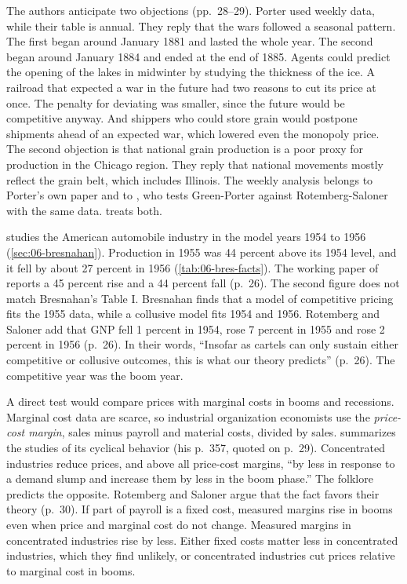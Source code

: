 The authors anticipate two objections (pp.~28--29). Porter used weekly data, while their table is annual. They reply
that the wars followed a seasonal pattern. The first began around January 1881 and lasted the whole year. The second
began around January 1884 and ended at the end of 1885. Agents could predict the opening of the lakes in midwinter by
studying the thickness of the ice. A railroad that expected a war in the future had two reasons to cut its price at
once. The penalty for deviating was smaller, since the future would be competitive anyway. And shippers who could store
grain would postpone shipments ahead of an expected war, which lowered even the monopoly price. The second objection is
that national grain production is a poor proxy for production in the Chicago region. They reply that national
movements mostly reflect the grain belt, which includes Illinois. The weekly analysis belongs to Porter's own paper and
to \citet{Ellison1994}, who tests Green-Porter against Rotemberg-Saloner with the same data. 
treats both.

\citet{Bresnahan1987} studies the American automobile industry in the model years 1954 to 1956 (\cref{sec:06-bresnahan}).
Production in 1955 was 44 percent above its 1954 level, and it fell by about 27 percent in 1956
(\cref{tab:06-bres-facts}). The working paper of \citet{RotembergSaloner1984} reports a 45 percent rise and a 44
percent fall (p.~26). The second figure does not match Bresnahan's Table I. Bresnahan finds that a model of
competitive pricing fits the 1955 data, while a collusive model fits 1954 and 1956. Rotemberg and Saloner add that GNP
fell 1 percent in 1954, rose 7 percent in 1955 and rose 2 percent in 1956 (p.~26). In their words, ``Insofar as
cartels can only sustain either competitive or collusive outcomes, this is what our theory predicts'' (p.~26). The
competitive year was the boom year.

A direct test would compare prices with marginal costs in booms and recessions. Marginal cost data are scarce, so
industrial organization economists use the \emph{price-cost margin}, sales minus payroll and material costs, divided by
sales. \citet{Scherer1980} summarizes the studies of its cyclical behavior (his p.~357, quoted on p.~29). Concentrated
industries reduce prices, and above all price-cost margins, ``by less in response to a demand slump and increase them
by less in the boom phase.'' The folklore predicts the opposite. Rotemberg and Saloner argue that the fact
favors their theory (p.~30). If part of payroll is a fixed cost, measured margins rise in booms even when price and
marginal cost do not change. Measured margins in concentrated industries rise by less. Either fixed costs matter less
in concentrated industries, which they find unlikely, or concentrated industries cut prices relative to marginal cost
in booms.

